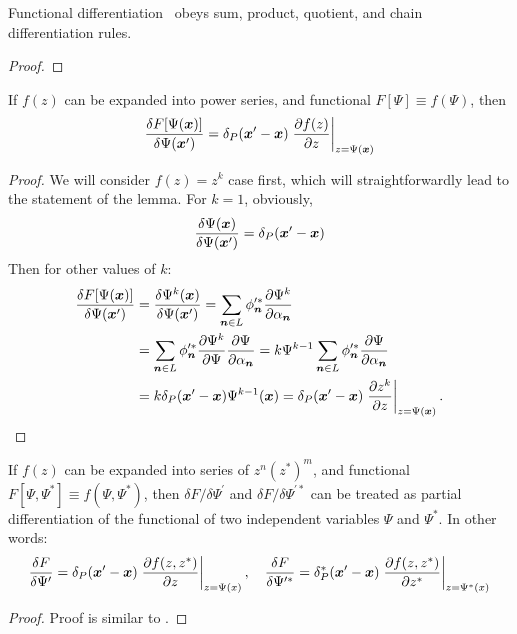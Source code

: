 \begin{lemma}
Functional differentiation~ obeys sum, product, quotient, and chain differentiation rules.
\end{lemma}
\begin{proof}
\end{proof}

\begin{lemma}
If $f(z)$ can be expanded into power series,
and functional $F[\Psi] \equiv f(\Psi)$, then
\[
	\frac{\delta F[\Psi(\boldsymbol{x})]}{\delta \Psi(\boldsymbol{x}^\prime)}
	= \delta_P(\boldsymbol{x}^\prime - \boldsymbol{x})
		\left. \frac{\partial f(z)}{\partial z} \right|_{z = \Psi(\boldsymbol{x})}
\]
\end{lemma}
\begin{proof}
We will consider $f(z) = z^k$ case first, which will straightforwardly lead to the statement of the lemma.
For $k = 1$, obviously,
\[
	\frac{\delta \Psi(\boldsymbol{x})}{\delta \Psi(\boldsymbol{x}^\prime)}
	= \delta_P(\boldsymbol{x}^\prime - \boldsymbol{x})
\]
Then for other values of $k$:
\begin{equation*}
\begin{split}
	\frac{\delta F[\Psi(\boldsymbol{x})]}{\delta \Psi(\boldsymbol{x}^\prime)}
	& = \frac{\delta \Psi^k(\boldsymbol{x})}{\delta \Psi(\boldsymbol{x}^\prime)}
	= \sum\limits_{\boldsymbol{n} \in L} \phi_{\boldsymbol{n}}^{\prime*}
		\frac{\partial \Psi^k}{\partial \alpha_{\boldsymbol{n}}} \\
	& = \sum\limits_{\boldsymbol{n} \in L} \phi_{\boldsymbol{n}}^{\prime*}
		\frac{\partial \Psi^k}{\partial \Psi}
		\frac{\partial \Psi}{\partial \alpha_{\boldsymbol{n}}}
	= k \Psi^{k-1}
		\sum\limits_{\boldsymbol{n} \in L} \phi_{\boldsymbol{n}}^{\prime*}
		\frac{\partial \Psi}{\partial \alpha_{\boldsymbol{n}}} \\
	& = k \delta_P(\boldsymbol{x}^\prime - \boldsymbol{x}) \Psi^{k-1}(\boldsymbol{x})
	= \delta_P(\boldsymbol{x}^\prime - \boldsymbol{x})
		\left. \frac{\partial z^k}{\partial z} \right|_{z = \Psi(\boldsymbol{x})}.
	\qedhere
\end{split}
\end{equation*}
\end{proof}

\begin{lemma}
If $f(z)$ can be expanded into series of $z^n (z^*)^m$,
and functional $F[\Psi, \Psi^*] \equiv f(\Psi, \Psi^*)$,
then $\delta F / \delta \Psi^\prime$ and $\delta F / \delta \Psi^{\prime*}$ can be treated as partial differentiation of the functional of two independent variables $\Psi$ and $\Psi^*$.
In other words:
\[
	\frac{\delta F}{\delta \Psi^\prime}
	= \delta_P(\boldsymbol{x}^\prime - \boldsymbol{x}) \left.
		\frac{\partial f(z, z^*)}{\partial z}
	\right|_{z=\Psi(x)},
	\quad
	\frac{\delta F}{\delta \Psi^{\prime*}}
	= \delta_P^*(\boldsymbol{x}^\prime - \boldsymbol{x}) \left.
		\frac{\partial f(z, z^*)}{\partial z^*}
	\right|_{z=\Psi^*(x)}
\]
\end{lemma}
\begin{proof}
Proof is similar to .
\end{proof}
